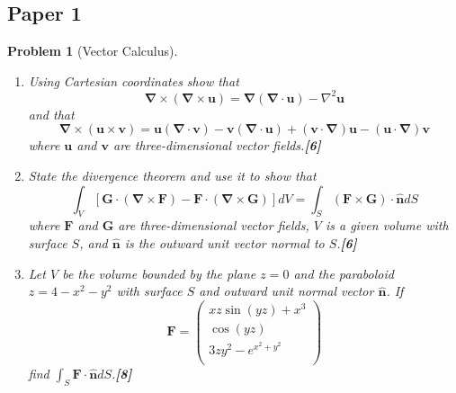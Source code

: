 \documentclass[a4paper]{article}
\theoremstyle{new}
\newtheorem{qns}{Problem}[section]
\begin{document}
\subsection{Paper 1}
\begin{qns}[Vector Calculus]\leavevmode
\begin{enumerate}[label=(\roman*)]
    \item  Using Cartesian coordinates show that
$$\boldsymbol{\nabla}\times(\boldsymbol{\nabla}\times\mathbf{u})=\boldsymbol{\nabla}(\boldsymbol{\nabla}\cdot\mathbf{u})-\nabla^2\mathbf{u}$$
and that
$$\boldsymbol{\nabla}\times(\mathbf{u}\times\mathbf{v})=\mathbf{u}(\boldsymbol{\nabla}\cdot\mathbf{v})-\mathbf{v}(\boldsymbol{\nabla}\cdot\mathbf{u})+(\mathbf{v}\cdot\boldsymbol{\nabla})\mathbf{u}-(\mathbf{u}\cdot\boldsymbol{\nabla})\mathbf{v}$$
where $\mathbf{u}$ and $\mathbf{v}$ are three-dimensional vector fields.\hfill \textbf{[6]}
\item State the divergence theorem and use it to show that
$$\int_V[\mathbf{G}\cdot(\boldsymbol{\nabla}\times\mathbf{F})-\mathbf{F}\cdot(\boldsymbol{\nabla}\times\mathbf{G})]dV=\int_S(\mathbf{F}\times\mathbf{G})\cdot\mathbf{\hat{n}}dS$$
where $\mathbf{F}$ and $\mathbf{G}$ are three-dimensional vector fields, $V$ is a given volume with surface $S$, and $\mathbf{\hat{n}}$ is the outward unit vector normal to $S$.\hfill \textbf{[6]}
\item Let $V$ be the volume bounded by the plane $z = 0$ and the paraboloid $z = 4−x^2−y^2$ with surface $S$ and outward unit normal vector $\mathbf{\hat{n}}$. If
$$\mathbf{F}=\begin{pmatrix}xz\sin(yz)+x^3\\\cos(yz)\\3zy^2-e^{x^2+y^2}\\\end{pmatrix}$$
find $\int_S\mathbf{F}\cdot\mathbf{\hat{n}}dS$.\hfill \textbf{[8]}
\end{enumerate}
\end{qns}
\end{document}
